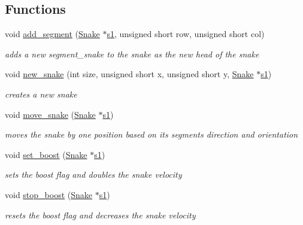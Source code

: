 \subsection*{Functions}
\begin{DoxyCompactItemize}
\item 
void \hyperlink{group__snake_ga9905deea86c0d94567ede79df04a2917}{add\+\_\+segment} (\hyperlink{structSnake}{Snake} $\ast$\hyperlink{group__man__events_gaf79c0d77b0cca9ebf96bbbed1f88aed0}{s1}, unsigned short row, unsigned short col)
\begin{DoxyCompactList}\small\item\em adds a new segment\+\_\+snake to the snake as the new head of the snake \end{DoxyCompactList}\item 
void \hyperlink{group__snake_ga0da33cffbcc02a3da21cb4b74271c429}{new\+\_\+snake} (int size, unsigned short x, unsigned short y, \hyperlink{structSnake}{Snake} $\ast$\hyperlink{group__man__events_gaf79c0d77b0cca9ebf96bbbed1f88aed0}{s1})
\begin{DoxyCompactList}\small\item\em creates a new snake \end{DoxyCompactList}\item 
void \hyperlink{group__snake_ga0ff179758d3dbd6aa7c79dc51776c9d7}{move\+\_\+snake} (\hyperlink{structSnake}{Snake} $\ast$\hyperlink{group__man__events_gaf79c0d77b0cca9ebf96bbbed1f88aed0}{s1})
\begin{DoxyCompactList}\small\item\em moves the snake by one position based on its segments direction and orientation \end{DoxyCompactList}\item 
void \hyperlink{group__snake_gabc6924be4961d75d44ed29f0a4ed5bbb}{set\+\_\+boost} (\hyperlink{structSnake}{Snake} $\ast$\hyperlink{group__man__events_gaf79c0d77b0cca9ebf96bbbed1f88aed0}{s1})
\begin{DoxyCompactList}\small\item\em sets the boost flag and doubles the snake velocity \end{DoxyCompactList}\item 
void \hyperlink{group__snake_ga471508bb9844c474f3c27e078aecc638}{stop\+\_\+boost} (\hyperlink{structSnake}{Snake} $\ast$\hyperlink{group__man__events_gaf79c0d77b0cca9ebf96bbbed1f88aed0}{s1})
\begin{DoxyCompactList}\small\item\em resets the boost flag and decreases the snake velocity \end{DoxyCompactList}\item 

\end{DoxyCompactItemize}
